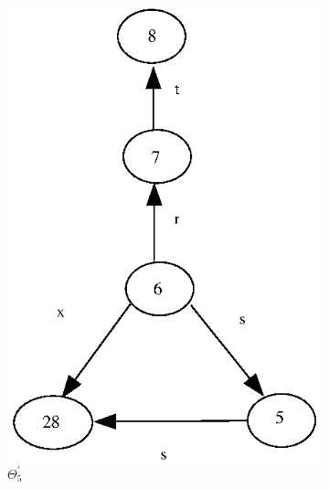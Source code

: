 \documentclass[a4paper,12pt]{article}
\numberwithin{equation}{section}
\numberwithin{figure}{section}
\begin{document}
\begin{figure}
\begin{center}
\begin{subfigure}[b]{.3\columnwidth}
\includegraphics[scale=0.5, angle=90, bb=0 0  82 280]{python/ex_K_i4.eps}
\caption{$\Theta_5^\prime$}
\label{fig:K_i4}
\end{subfigure}
\hspace*{2cm}
\begin{subfigure}[b]{.3\columnwidth}

\end{subfigure}
\end{center}
\end{figure}
\end{document}

